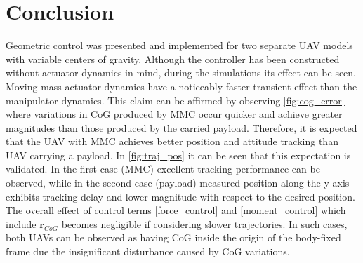 \section{Conclusion} \label{sec:conclusion}
Geometric control was presented and implemented for two separate UAV models with variable centers of gravity. Although the controller has been constructed without actuator dynamics in mind, during the simulations its effect can be seen. \\
Moving mass actuator dynamics have a noticeably faster transient effect than the manipulator dynamics. This claim can be affirmed by observing \ref{fig:cog_error} where variations in CoG produced by MMC occur quicker and achieve greater magnitudes than those produced by the carried payload. Therefore, it is expected that the UAV with MMC achieves better position and attitude tracking than UAV carrying a payload. In \ref{fig:traj_pos} it can be seen that this expectation is validated. In the first case (MMC) excellent tracking performance can be observed, while in the second case (payload) measured position along the y-axis exhibits tracking delay and lower magnitude with respect to the desired position. \\
The overall effect of control terms \eqref{force_control} and \eqref{moment_control} which include $\textbf{r}_{CoG}$ becomes negligible if considering slower trajectories. In such cases, both UAVs can be observed as having CoG inside the origin of the body-fixed frame due the insignificant disturbance caused by CoG variations. 
